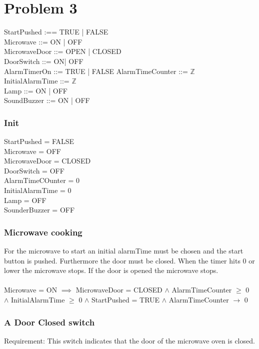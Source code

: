 


\chapter{Problem 3}

StartPushed :== TRUE | FALSE \\
Microwave ::= ON | OFF  \\
MicrowaveDoor ::= OPEN | CLOSED \\
DoorSwitch ::= ON| OFF \\
AlarmTimerOn ::= TRUE | FALSE
AlarmTimeCounter ::= $\mathbb{Z}$ \\
InitialAlarmTime ::= $\mathbb{Z}$ \\
Lamp ::= ON | OFF \\
SoundBuzzer ::= ON | OFF \\

\subsection{Init}

StartPushed = FALSE \\
Microwave = OFF \\
MicrowaveDoor = CLOSED \\
DoorSwitch = OFF \\
AlarmTimeCOunter = 0 \\
InitialAlarmTime = 0 \\
Lamp = OFF \\
SounderBuzzer = OFF \\

\subsection{Microwave cooking}
For the microwave to start an initial alarmTime must be chosen and the start button is pushed. Furthermore the door must be closed. When the timer hits 0 or lower the microwave stops. If the door is opened the microwave stops. \\
\\
Microwave = ON $\implies$ MicrowaveDoor = CLOSED $\wedge$ AlarmTimeCounter $\geq$ 0 $\wedge$ InitialAlarmTime $\geq$ 0 $\wedge$ StartPushed = TRUE $\wedge$ AlarmTimeCounter $\rightarrow$ 0


\subsection{A Door Closed switch}
Requirement: This switch indicates that the door of the microwave oven is  closed.

